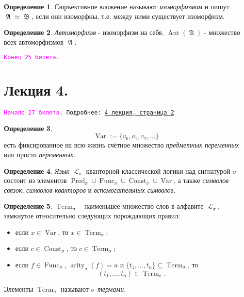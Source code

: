 \documentclass[a4paper,100pt]{article}
\theoremstyle{indented}
\theoremstyle{definition}
\newtheorem{defn}{Определение}
\theoremstyle{remark}
\DeclareMathOperator{\LL}{\mathscr{L}}
\DeclareMathOperator{\Pred}{Pred}
\DeclareMathOperator{\Func}{Func}
\DeclareMathOperator{\Const}{Const}
\DeclareMathOperator{\arity}{arity}
\DeclareMathOperator{\Aut}{Aut}
\DeclareMathOperator{\Var}{Var}
\DeclareMathOperator{\Term}{Term}
\DeclareMathOperator{\GA}{\mathfrak{A}}
\DeclareMathOperator{\GB}{\mathfrak{B}}
\begin{document}
\begin{defn}
  Сюръективное вложение называют \textit{изоморфизмом} и пишут $\GA \simeq \GB$, если они изоморфны, т.е. между ними существует изоморфизм.
\end{defn}

\begin{defn}
  \textit{Автоморфизм} - изоморфизм на себя. $\Aut(\GA)$ - множество всех автоморфизмов $\GA$. 
\end{defn}

\texttt{\textcolor{magenta}{Конец 25 билета.}} 

\hrulefill

\section{Лекция 4.} 

\hrulefill

\texttt{\hypertarget{b27}{\textcolor{magenta}{Начало 27 билета.}} Подробнее: \href{http://www.mi-ras.ru/~speranski/courses/logic-1-2021-spring/slides_4.pdf}{4 лекция, страница 2}} 

\begin{defn}
  \[
    \Var:=\{v_0, v_1, v_2, \ldots \}
  \]
  есть фиксированное на всю жизнь счётное множество \textit{предметных переменных} или просто \textit{переменных}.
\end{defn}

\begin{defn}
  \textit{Язык} $\LL_\sigma$ кванторной классической логики над сигнатурой $\sigma$ состоит из элементов $\Pred_\sigma \cup \Func_\sigma \cup \Const_\sigma \cup \Var$, а также \textit{символов связок}, \textit{символов кванторов} и \textit{вспомогательных символов}.
\end{defn}

\begin{defn}
  $\Term_\sigma$ - наименьшее множество слов в алфавите $\LL_\sigma$, замкнутое относительно следующих порождающих правил: 
  
  \begin{itemize}
    \item если $x\in \Var$, то $x\in \Term_\sigma$; 
    \item если $c\in \Const_\sigma$, то $c\in \Term_\sigma$; 
    \item если $f\in \Func_\sigma$, $\arity_\sigma (f)=n$ и $\{t_1, \ldots, t_n\}\subseteq \Term_\sigma$, то 
    \[
      (t_1, \ldots, t_n)\in \Term_\sigma.
    \]
  \end{itemize}

  Элементы $\Term_\sigma$ называют \textit{$\sigma$-термами}.
\end{defn}
\end{document}
